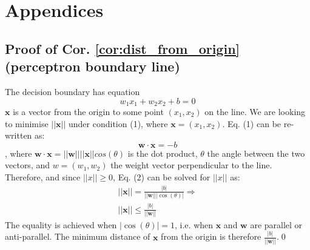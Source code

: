 \documentclass[a4paper]{article}
\begin{document}



%

\newpage
\appendix

\section{Appendices}

\newpage
\subsection{Proof of Cor. \ref{cor:dist_from_origin} (perceptron boundary line)}
\label{app:min_dist_origin}

The decision boundary has equation
\[
w_1x_1 + w_2x_2 + b = 0 \tag{1}
\]
$\textbf{x}$ is a vector from the origin to some point $(x_1,x_2)$ on the line. We are looking to minimise $\left|\left| \textbf{x}\right|\right|$ under condition (1), where $\textbf{x}=(x_1,x_2)$. Eq. (1) can be re-written as:
\[
\textbf{w}\cdot \textbf{x} = -b \tag{2}
\]
, where $\textbf{w}\cdot \textbf{x} = \left|\left| \textbf{w}\right|\right| \left|\left| \textbf{x}\right|\right|cos\left(\theta \right)$ is the dot product, $\theta$ the angle between the two vectors, and $w=(w_1,w_2)$ the weight vector perpendicular to the line. Therefore, and since $\left|\left|x\right| \right|\geq 0$,  Eq. (2) can be solved for $\left|\left|x\right| \right|$ as:
\begin{gather*}
\left|\left|\textbf{x}\right| \right| =  \frac{\left|b\right|}{\left|\left|\textbf{w} \right| \right| \left|\cos(\theta)\right |} \Rightarrow \\
\left|\left|\textbf{x}\right| \right| \leq \frac{\left|b\right|}{\left|\left|\textbf{w} \right| \right|}
\end{gather*}
The equality is achieved when $\left| \cos(\theta) \right|= 1$, i.e. when $\textbf{x}$ and $\textbf{w}$ are parallel or anti-parallel. The minimum distance of $\textbf{x}$ from the origin is therefore $\frac{\left|b\right|}{\left|\left|\textbf{w} \right| \right|}$.\qed
\end{document}
